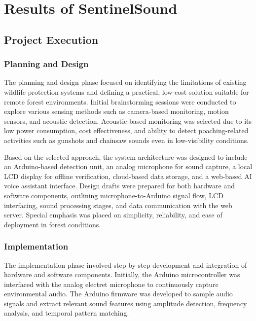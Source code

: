 \documentclass[11pt,a4paper,oneside]{report}
\begin{document}
\chapter{Results of SentinelSound}

\section{Project Execution}
\subsection{Planning and Design}
The planning and design phase focused on identifying the limitations of existing wildlife protection systems and defining a practical, low-cost solution suitable for remote forest environments. Initial brainstorming sessions were conducted to explore various sensing methods such as camera-based monitoring, motion sensors, and acoustic detection. Acoustic-based monitoring was selected due to its low power consumption, cost effectiveness, and ability to detect poaching-related activities such as gunshots and chainsaw sounds even in low-visibility conditions.

Based on the selected approach, the system architecture was designed to include an Arduino-based detection unit, an analog microphone for sound capture, a local LCD display for offline verification, cloud-based data storage, and a web-based AI voice assistant interface. Design drafts were prepared for both hardware and software components, outlining microphone-to-Arduino signal flow, LCD interfacing, sound processing stages, and data communication with the web server. Special emphasis was placed on simplicity, reliability, and ease of deployment in forest conditions.

\subsection{Implementation}
The implementation phase involved step-by-step development and integration of hardware and software components. Initially, the Arduino microcontroller was interfaced with the analog electret microphone to continuously capture environmental audio. The Arduino firmware was developed to sample audio signals and extract relevant sound features using amplitude detection, frequency analysis, and temporal pattern matching.
\end{document}
